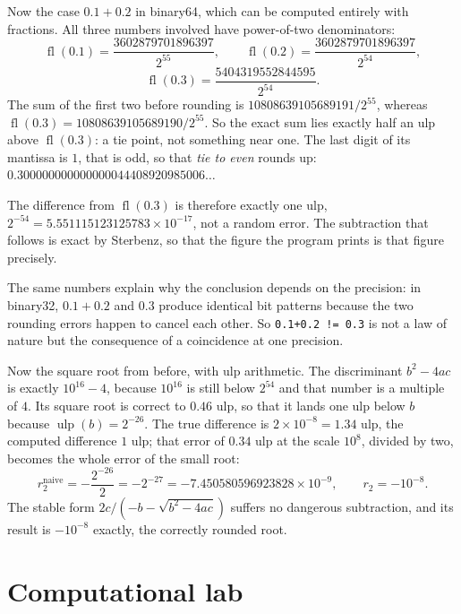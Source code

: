 Now the case $0.1+0.2$ in binary64, which can be computed entirely with
fractions. All three numbers involved have power-of-two denominators:
\[
  \operatorname{fl}(0.1)=\frac{3602879701896397}{2^{55}},\qquad
  \operatorname{fl}(0.2)=\frac{3602879701896397}{2^{54}},
\]
\[
  \operatorname{fl}(0.3)=\frac{5404319552844595}{2^{54}}.
\]
The sum of the first two before rounding is $10808639105689191/2^{55}$,
whereas $\operatorname{fl}(0.3)=10808639105689190/2^{55}$. So the exact sum
lies exactly half an ulp above $\operatorname{fl}(0.3)$: a tie point, not something near
one. The last digit of its mantissa is $1$, that is odd, so that \emph{tie to even}
rounds up: $0.300000000000000044408920985006\dots$

The difference from $\operatorname{fl}(0.3)$ is therefore exactly one ulp,
$2^{-54}=5.551115123125783\times10^{-17}$, not a random error. The subtraction that
follows is exact by Sterbenz, so that the figure the program prints is that figure
precisely.

The same numbers explain why the conclusion depends on the precision: in
binary32, $0.1+0.2$ and $0.3$ produce identical bit patterns because the two
rounding errors happen to cancel each other. So \texttt{0.1+0.2 != 0.3} is not a law of
nature but the consequence of a coincidence at one precision.

Now the square root from before, with ulp arithmetic. The discriminant $b^{2}-4ac$ is
exactly $10^{16}-4$, because $10^{16}$ is still below $2^{54}$ and that number is a
multiple of $4$. Its square root is correct to $0.46$ ulp, so that it lands one ulp
below $b$ because $\operatorname{ulp}(b)=2^{-26}$. The true difference is $2\times10^{-8}=1.34$ ulp,
the computed difference $1$ ulp; that error of $0.34$ ulp at the scale $10^{8}$, divided
by two, becomes the whole error of the small root:
\[
  r_{2}^{\text{naive}}=-\frac{2^{-26}}{2}=-2^{-27}
  =-7.450580596923828\times10^{-9},
  \qquad r_{2}=-10^{-8}.
\]
The stable form $2c/(-b-\sqrt{b^{2}-4ac})$ suffers no dangerous subtraction, and
its result is $-10^{-8}$ exactly, the correctly rounded root.
\section{Computational lab}

